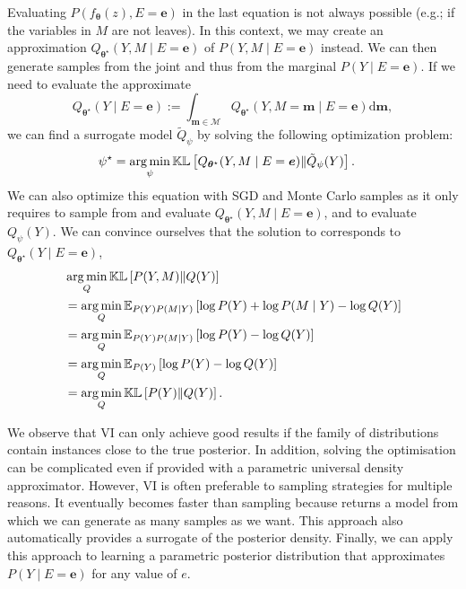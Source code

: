 Evaluating $P(f_{\bm{\theta}}(z), E=\bm{e})$ in the last equation is not always possible (e.g.; if the variables in $M$ are not leaves). In this context, we may create an approximation $Q_{\bm{\theta}^\star}(Y, M\mid E=\bm{e})$ of $P(Y, M\mid E=\bm{e})$ instead. We can then generate samples from the joint and thus from the marginal $P(Y\mid E=\bm{e})$. If we need to evaluate the approximate
$$Q_{\bm{\theta}^\star}(Y\mid E=\bm{e}) := \int_{\bm{m} \in \mathcal{M}} Q_{\bm{\theta}^\star}(Y, M=\bm{m}\mid E=\bm{e}) \text{d}\bm{m},$$ we can find a surrogate model $\tilde Q_\psi$ by solving the following optimization problem:
\begin{align}
  \psi^\star &= \operatorname*{arg\,min}_\psi \mathbb{KL}\left[Q_{\bm{\theta}^\star}(Y, M\mid E=\bm{e})\Vert \tilde Q_\psi(Y) \right]. \label{eq:approx_posterior}
\end{align}
We can also optimize this equation with SGD and Monte Carlo samples as it only requires to sample from and evaluate $Q_{\bm{\theta}^\star}(Y, M\mid E=\bm{e})$, and to evaluate $Q_\psi(Y)$. We can convince ourselves that the solution to  corresponds to $Q_{\bm{\theta}^\star}(Y\mid E=\bm{e})$,
\begin{align}
  &\operatorname*{arg\,min}_Q \mathbb{KL}\left[P(Y, M)\Vert Q(Y) \right]\\
  &=\operatorname*{arg\,min}_Q \mathbb{E}_{P(Y) P(M\mid Y)}\left[\log P(Y) + \log P(M\mid Y) - \log Q(Y)\right]\\
  &=\operatorname*{arg\,min}_Q \mathbb{E}_{P(Y) P(M\mid Y)}\left[\log P(Y) - \log Q(Y)\right]\\
  &= \operatorname*{arg\,min}_Q \mathbb{E}_{P(Y)}\left[\log P(Y) - \log Q(Y)\right]\\
  &= \operatorname*{arg\,min}_Q \mathbb{KL}\left[P(Y)\Vert Q(Y) \right].
\end{align}

We observe that VI can only achieve good results if the family of distributions contain instances close to the true posterior. In addition, solving the optimisation can be complicated even if provided with a parametric universal density approximator. However, VI is often preferable to sampling strategies for multiple reasons. It eventually becomes faster than sampling because  returns a model from which we can generate as many samples as we want. This approach also automatically provides a surrogate of the posterior density. Finally, we can apply this approach to learning a parametric posterior distribution that approximates $P(Y\mid E=\bm{e})$ for any value of $e$.


